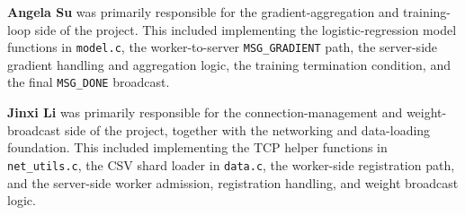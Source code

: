 \documentclass[11pt]{article}
\begin{document}
\textbf{Angela Su} was primarily responsible for the gradient-aggregation and training-loop side of the project. This included implementing the logistic-regression model functions in \texttt{model.c}, the worker-to-server \texttt{MSG\_GRADIENT} path, the server-side gradient handling and aggregation logic, the training termination condition, and the final \texttt{MSG\_DONE} broadcast.

\textbf{Jinxi Li} was primarily responsible for the connection-management and weight-broadcast side of the project, together with the networking and data-loading foundation. This included implementing the TCP helper functions in \texttt{net\_utils.c}, the CSV shard loader in \texttt{data.c}, the worker-side registration path, and the server-side worker admission, registration handling, and weight broadcast logic.
\end{document}
